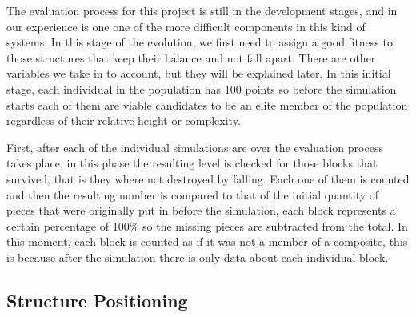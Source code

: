 \documentclass[conference]{IEEEtran}
\begin{document}
    The evaluation process for this project is still in the development stages,
    and in our experience is one one of the more difficult components in this
    kind of systems. In this stage of the evolution, we first need to assign a
    good fitness to those structures that keep their balance and not fall apart.
    There are other variables we take in to account, but they will be explained
    later. In this initial stage, each individual in the population has 100
    points so before the simulation starts each of them are viable candidates to
    be an elite member of the population regardless of their relative height or
    complexity.
    
    First, after each of the individual simulations are over the evaluation process
    takes place, in this phase the resulting level is checked for those blocks that
    survived, that is they where not destroyed by falling. Each one
    of them is counted and then the resulting number is compared to that of the
    initial quantity of pieces that were originally put in before the simulation,
    each block represents a certain percentage of 100\% so the missing pieces 
    are subtracted from the total. In this moment, each block is counted as if 
    it was not a member of a composite, this is because after the simulation there is
    only data about each individual block.

    \subsection{Structure Positioning}
\end{document}
